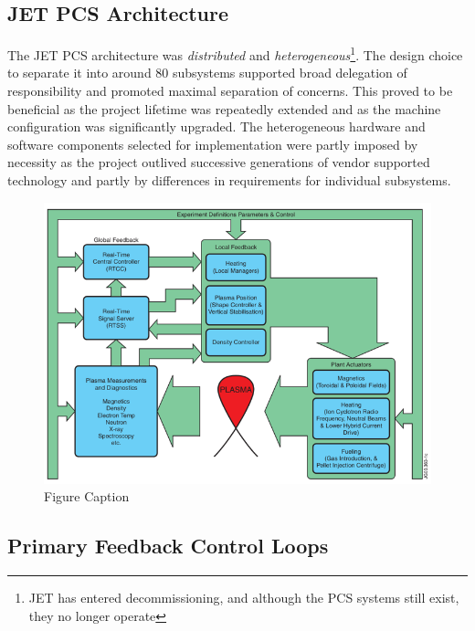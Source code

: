 \documentclass[preprint,12pt]{elsarticle}
\begin{document}
\subsection{JET PCS Architecture}

The JET PCS architecture was
{\em distributed} and {\em heterogeneous}\footnote{JET has entered decommissioning, and although the PCS systems still exist, they no longer operate}.  
The design choice to separate it into around 80 subsystems supported broad delegation of responsibility and
promoted maximal separation of concerns. This proved to be beneficial as the project lifetime was repeatedly extended and as the machine configuration was 
significantly upgraded.  The heterogeneous hardware and software components selected for implementation were partly imposed by necessity as the project outlived successive generations of vendor supported  technology and partly by differences in requirements for individual subsystems.

\begin{figure}[t]%
\centering%
	\includegraphics{JG_Felton}
\vspace{1.5in}
\caption{Figure Caption}\label{fig1}
\end{figure}

\subsection{Primary Feedback Control Loops}
\end{document}
